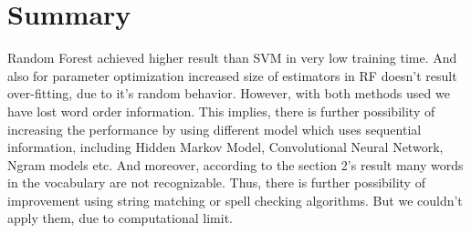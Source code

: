 \documentclass[10pt,conference,compsocconf]{IEEEtran}
\begin{document}
\section{Summary}\label{s6}
\label{S6}

Random Forest achieved higher result than SVM in very low training time. And also for parameter optimization increased size of estimators in RF doesn't result over-fitting, due to it's random behavior.
However, with both methods used we have lost word order information. This implies, there is further possibility of increasing the performance by using different model which uses sequential information, including Hidden Markov Model, Convolutional Neural Network, Ngram models etc. And moreover, according to the section 2's result many words in the vocabulary are not recognizable. Thus, there is further possibility of improvement using string matching or spell checking algorithms. But we couldn't apply them, due to computational limit. 


\end{document}
